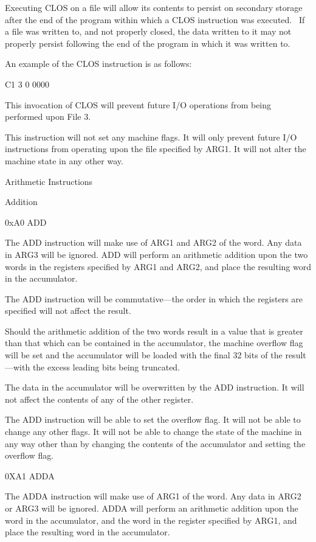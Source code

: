 \documentclass[]{article}
\begin{document}
Executing CLOS on a file will allow its contents to persist on secondary
storage after the end of the program within which a CLOS instruction was
executed.~ If a file was written to, and not properly closed, the data
written to it may not properly persist following the end of the program
in which it was written to.

An example of the CLOS instruction is as follows:

C1 3 0 0000

This invocation of CLOS will prevent future I/O operations from being
performed upon File 3.

This instruction will not set any machine flags. It will only prevent
future I/O instructions from operating upon the file specified by ARG1.
It will not alter the machine state in any other way.

Arithmetic Instructions

Addition

0xA0 ADD

The ADD instruction will make use of ARG1 and ARG2 of the word. Any data
in ARG3 will be ignored. ADD will perform an arithmetic addition upon
the two words in the registers specified by ARG1 and ARG2, and place the
resulting word in the accumulator.

The ADD instruction will be commutative---the order in which the
registers are specified will not affect the result.~

Should the arithmetic addition of the two words result in a value that
is greater than that which can be contained in the accumulator, the
machine overflow flag will be set and the accumulator will be loaded
with the final 32 bits of the result---with the excess leading bits
being truncated.~

The data in the accumulator will be overwritten by the ADD instruction.
It will not affect the contents of any of the other register.~

The ADD instruction will be able to set the overflow flag. It will not
be able to change any other flags. It will not be able to change the
state of the machine in any way other than by changing the contents of
the accumulator and setting the overflow flag.

0XA1 ADDA

The ADDA instruction will make use of ARG1 of the word. Any data in ARG2
or ARG3 will be ignored. ADDA will perform an arithmetic addition upon
the word in the accumulator, and the word in the register specified by
ARG1, and place the resulting word in the accumulator.
\end{document}
